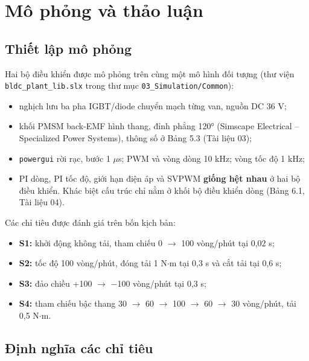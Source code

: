 
\section{Mô phỏng và thảo luận}\label{sec:7}

\subsection{Thiết lập mô phỏng}\label{sec:7.1}

Hai bộ điều khiển được mô phỏng trên cùng một mô hình đối tượng (thư viện \texttt{bldc\_plant\_lib.slx} trong thư mục \texttt{03\_Simulation/Common}):

\begin{itemize}[leftmargin=*]
\item nghịch lưu ba pha IGBT/diode chuyển mạch từng van, nguồn DC 36 V;
\item khối PMSM back-EMF hình thang, đỉnh phẳng 120° (Simscape Electrical – Specialized Power Systems), thông số ở Bảng 5.3 (Tài liệu 03);
\item \texttt{powergui} rời rạc, bước 1 $\mu$s; PWM và vòng dòng 10 kHz; vòng tốc độ 1 kHz;
\item PI dòng, PI tốc độ, giới hạn điện áp và SVPWM \textbf{giống hệt nhau} ở hai bộ điều khiển. Khác biệt cấu trúc chỉ nằm ở khối bộ điều khiển dòng (Bảng 6.1, Tài liệu 04).
\end{itemize}

Các chỉ tiêu được đánh giá trên bốn kịch bản:

\begin{itemize}[leftmargin=*]
\item \textbf{S1:} khởi động không tải, tham chiếu 0 $\to$ 100 vòng/phút tại 0,02 s;
\item \textbf{S2:} tốc độ 100 vòng/phút, đóng tải 1 N$\cdot$m tại 0,3 s và cắt tải tại 0,6 s;
\item \textbf{S3:} đảo chiều +100 $\to$ $-$100 vòng/phút tại 0,3 s;
\item \textbf{S4:} tham chiếu bậc thang 30 $\to$ 60 $\to$ 100 $\to$ 60 $\to$ 30 vòng/phút, tải 0,5 N$\cdot$m.
\end{itemize}

\subsection{Định nghĩa các chỉ tiêu}\label{sec:7.2}

